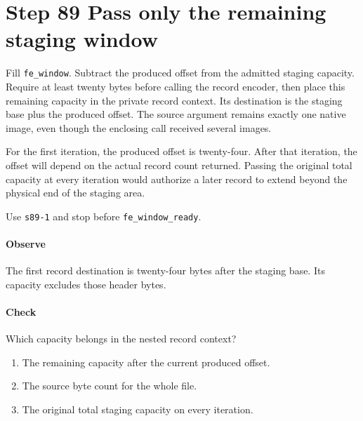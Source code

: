 \section{Step 89 Pass only the remaining staging window}
Fill \texttt{fe\_window}. Subtract the produced offset from the admitted staging capacity. Require at least twenty bytes before calling the record encoder, then place this remaining capacity in the private record context. Its destination is the staging base plus the produced offset. The source argument remains exactly one native image, even though the enclosing call received several images.

For the first iteration, the produced offset is twenty-four. After that iteration, the offset will depend on the actual record count returned. Passing the original total capacity at every iteration would authorize a later record to extend beyond the physical end of the staging area.

Use \texttt{s89-1} and stop before \texttt{fe\_window\_ready}.

\paragraph{Observe} The first record destination is twenty-four bytes after the staging base. Its capacity excludes those header bytes.

\paragraph{Check} Which capacity belongs in the nested record context?
\begin{enumerate}[label=\Alph*.]
\item The remaining capacity after the current produced offset.
\item The source byte count for the whole file.
\item The original total staging capacity on every iteration.
\end{enumerate}
